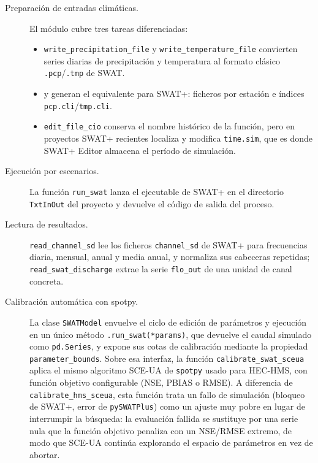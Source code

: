 \begin{description}
  \item[Preparación de entradas climáticas.] El módulo cubre tres tareas diferenciadas:
  \begin{itemize}
    \item \texttt{write\_precipitation\_file} y \texttt{write\_temperature\_file} convierten series diarias de precipitación y temperatura al formato clásico \texttt{.pcp}/\texttt{.tmp} de SWAT.
    \item \texttt{} y \texttt{} generan el equivalente para SWAT+: ficheros por estación e índices \texttt{pcp.cli}/\texttt{tmp.cli}.
    \item \texttt{edit\_file\_cio} conserva el nombre histórico de la función, pero en proyectos SWAT+ recientes localiza y modifica \texttt{time.sim}, que es donde SWAT+ Editor almacena el período de simulación.
  \end{itemize}

  \item[Ejecución por escenarios.] La función \texttt{run\_swat} lanza el ejecutable de SWAT+ en el directorio \texttt{TxtInOut} del proyecto y devuelve el código de salida del proceso.

  \item[Lectura de resultados.] \texttt{read\_channel\_sd} lee los ficheros \texttt{channel\_sd} de SWAT+ para frecuencias diaria, mensual, anual y media anual, y normaliza sus cabeceras repetidas; \texttt{read\_swat\_discharge} extrae la serie \texttt{flo\_out} de una unidad de canal concreta.

  \item[Calibración automática con spotpy.] La clase \texttt{SWATModel} envuelve el ciclo de edición de parámetros y ejecución en un único método \texttt{.run\_swat(*params)}, que devuelve el caudal simulado como \texttt{pd.Series}, y expone sus cotas de calibración mediante la propiedad \texttt{parameter\_bounds}. Sobre esa interfaz, la función \texttt{calibrate\_swat\_sceua} aplica el mismo algoritmo SCE-UA de \texttt{spotpy} usado para HEC-HMS, con función objetivo configurable (NSE, PBIAS o RMSE). A diferencia de \texttt{calibrate\_hms\_sceua}, esta función trata un fallo de simulación (bloqueo de SWAT+, error de \texttt{pySWATPlus}) como un ajuste muy pobre en lugar de interrumpir la búsqueda: la evaluación fallida se sustituye por una serie nula que la función objetivo penaliza con un NSE/RMSE extremo, de modo que SCE-UA continúa explorando el espacio de parámetros en vez de abortar.
\end{description}

